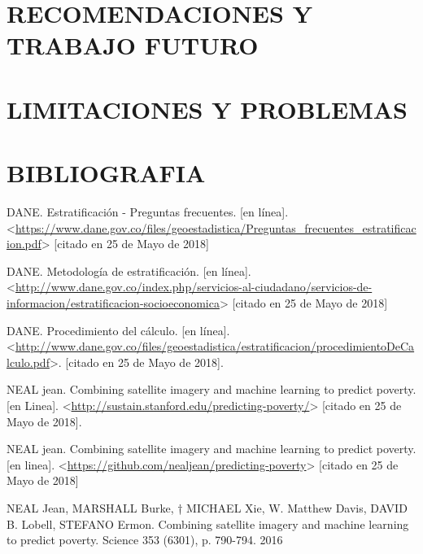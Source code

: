     
    
    
   
        
   
   
   
 
    
    
    
     
    \newpage\chapter{RECOMENDACIONES Y TRABAJO FUTURO}
    
    
    
    
    \newpage\chapter{LIMITACIONES Y PROBLEMAS} 
    
    
    
    


    
\newpage\chapter*{BIBLIOGRAFIA}

DANE. Estratificación - Preguntas frecuentes. [en línea]. <\url{https://www.dane.gov.co/files/geoestadistica/Preguntas_frecuentes_estratificacion.pdf}> [citado en 25 de Mayo de 2018]
    
DANE. Metodología de estratificación. [en línea].
 <\url{http://www.dane.gov.co/index.php/servicios-al-ciudadano/servicios-de-informacion/estratificacion-socioeconomica}> [citado en 25 de Mayo de 2018]

DANE. Procedimiento del cálculo. [en línea].
 <\url{http://www.dane.gov.co/files/geoestadistica/estratificacion/procedimientoDeCalculo.pdf}>.
 [citado en 25 de Mayo de 2018].
 
NEAL jean. Combining satellite imagery and machine learning to predict poverty. [en Linea]. <\url{http://sustain.stanford.edu/predicting-poverty/}> [citado en 25 de Mayo de 2018].

NEAL jean. Combining satellite imagery and machine learning to predict poverty. [en linea]. <\url{https://github.com/nealjean/predicting-poverty}> [citado en 25 de Mayo de 2018]

NEAL Jean, MARSHALL Burke, † MICHAEL Xie, W. Matthew Davis, DAVID B. Lobell, STEFANO Ermon. Combining satellite imagery and machine learning to predict poverty. Science 353 (6301), p. 790-794. 2016

